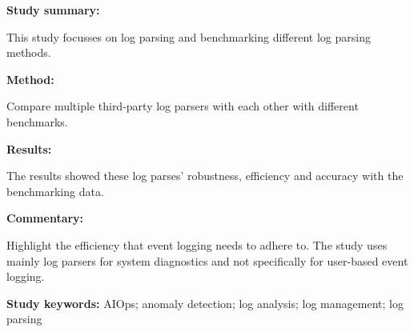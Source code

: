 \begin{tcolorbox}[colback=gray!5!white, colframe=pastelgreen!40!black, title=Tools and Benchmarks for Automated Log Parsing\cite{Zhu2019}]
	\begin{minipage}[t]{0.25\textwidth}
		\textbf{Study summary:}
	\end{minipage}
	\hfill
	\begin{minipage}[t]{0.65\textwidth}
		This study focusses on log parsing and benchmarking different log parsing methods. 
	\end{minipage}

	\vspace{0.75em} 

	\begin{minipage}[t]{0.25\textwidth}
		\textbf{Method:}
	\end{minipage}
	\hfill
	\begin{minipage}[t]{0.65\textwidth}
		Compare multiple third-party log parsers with each other with different benchmarks.
	\end{minipage}

	\vspace{0.75em} 

	\begin{minipage}[t]{0.25\textwidth}
		\textbf{Results:}
	\end{minipage}
	\hfill
	\begin{minipage}[t]{0.65\textwidth}
		The results showed these log parses' robustness, efficiency and accuracy with the benchmarking data.
	\end{minipage}

	\vspace{0.75em} 

	\begin{minipage}[t]{0.25\textwidth}
		\textbf{Commentary:}
	\end{minipage}
	\hfill
	\begin{minipage}[t]{0.65\textwidth}
		Highlight the efficiency that event logging needs to adhere to. The study uses mainly log
parsers for system diagnostics and not specifically for user-based event logging.
	\end{minipage}
	\tcblower
	\textbf{Study keywords:} AIOps; anomaly detection; log analysis; log management; log parsing
\end{tcolorbox}

